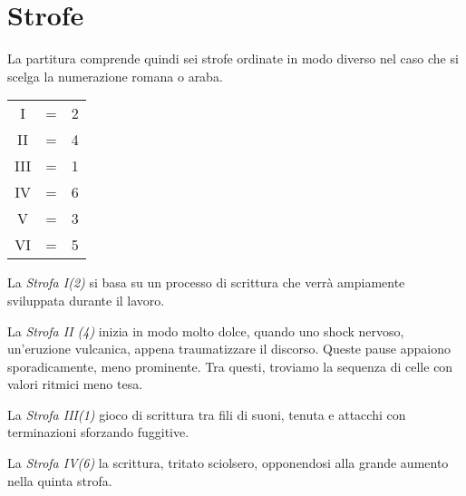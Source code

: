 
\section*{Strofe}

La partitura comprende quindi sei strofe ordinate in modo diverso nel caso che si scelga la numerazione romana o araba. 

\begin{minipage}[t]{0.89\columnwidth}%

\begin{table}[H]
\begin{tabular}{c c c}

I 	& = & 2 \\
II	& = & 4 \\
III	& = & 1 \\
IV	& = & 6 \\
V	& = & 3 \\
VI	& = & 5 \\

\end{tabular}
\end{table}%

\end{minipage}%
\bigskip

La \emph{Strofa I(2)} si basa su un processo di scrittura che verrà ampiamente sviluppata durante il lavoro. %

La \emph{Strofa II (4)} inizia in modo molto dolce, quando uno shock nervoso, un'eruzione vulcanica, appena traumatizzare il discorso. Queste pause appaiono sporadicamente, meno prominente. Tra questi, troviamo la sequenza di celle con valori ritmici meno tesa.

La \emph{Strofa III(1)} gioco di scrittura tra fili di suoni, tenuta e attacchi con terminazioni sforzando fuggitive.

La \emph{Strofa IV(6)} la scrittura, tritato sciolsero, opponendosi alla grande aumento nella quinta strofa.

